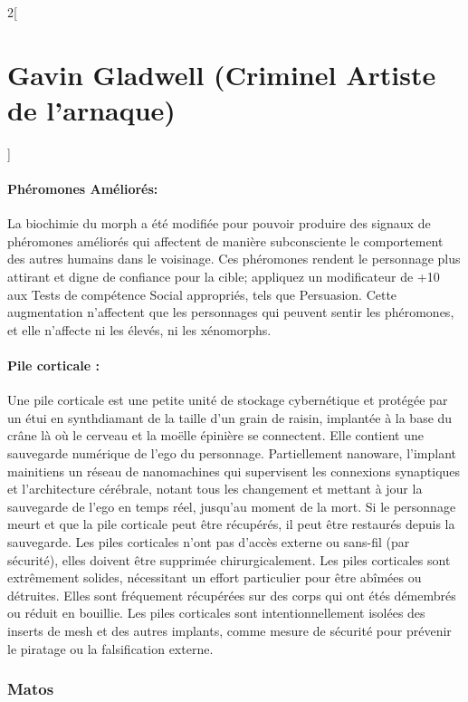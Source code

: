 \documentclass[a4paper,9pt]{article}
\begin{document}
\begin{multicols}{2}[\section*{Gavin Gladwell (Criminel Artiste de l'arnaque)}]
\paragraph{Phéromones Améliorés: }La biochimie du morph a été modifiée pour
pouvoir produire des signaux de phéromones améliorés qui affectent de manière
subconsciente le comportement des autres humains dans le voisinage. Ces
phéromones rendent le personnage plus attirant et digne de confiance pour la
cible; appliquez un modificateur de +10 aux Tests de compétence Social
appropriés, tels que Persuasion. Cette augmentation n'affectent que les
personnages qui peuvent sentir les phéromones, et elle n'affecte ni les élevés,
ni les xénomorphs.

\paragraph{Pile corticale :}
Une pile corticale est une petite unité de stockage cybernétique et protégée
par un étui en synthdiamant de la taille d'un grain de raisin, implantée à la
base du crâne là où le cerveau et la moëlle épinière se connectent. Elle
contient une sauvegarde numérique de l'ego du personnage. Partiellement
nanoware, l'implant mainitiens un réseau de nanomachines qui supervisent
les connexions synaptiques et l'architecture cérébrale, notant tous les
changement et mettant à jour la sauvegarde de l'ego en temps réel, jusqu'au
moment de la mort. Si le personnage meurt et que la pile corticale peut être
récupérés, il peut être restaurés depuis la sauvegarde. Les piles corticales
n'ont pas d'accès externe ou sans-fil (par sécurité), elles doivent être
supprimée chirurgicalement. Les piles corticales sont extrêmement solides,
nécessitant un effort particulier pour être abîmées ou détruites. Elles sont
fréquement récupérées sur des corps qui ont étés démembrés ou réduit en
bouillie. Les piles corticales sont intentionnellement isolées des inserts de
mesh et des autres implants, comme mesure de sécurité pour prévenir le piratage
ou la falsification externe.

\subsubsection*{Matos}

\end{multicols}
\end{document}
